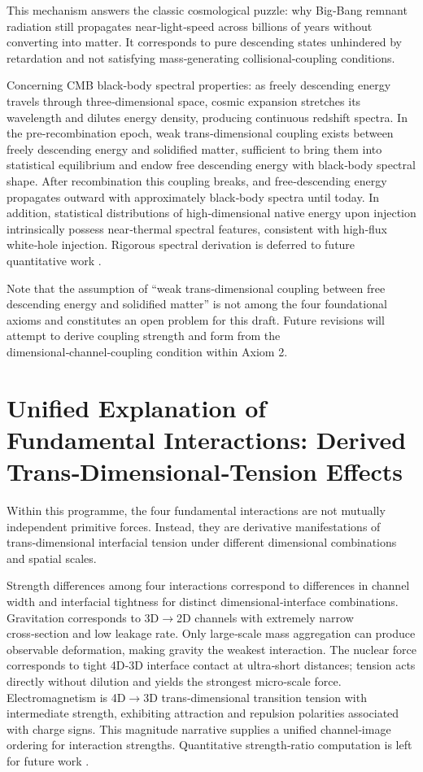 \documentclass[12pt,a4paper]{article}
\begin{document}
This mechanism answers the classic cosmological puzzle: why Big‑Bang remnant radiation still propagates near‑light‑speed across billions of years without converting into matter. It corresponds to pure descending states unhindered by retardation and not satisfying mass‑generating collisional‑coupling conditions.

Concerning CMB black‑body spectral properties: as freely descending energy travels through three‑dimensional space, cosmic expansion stretches its wavelength and dilutes energy density, producing continuous redshift spectra. In the pre‑recombination epoch, weak trans‑dimensional coupling exists between freely descending energy and solidified matter, sufficient to bring them into statistical equilibrium and endow free descending energy with black‑body spectral shape. After recombination this coupling breaks, and free‑descending energy propagates outward with approximately black‑body spectra until today. In addition, statistical distributions of high‑dimensional native energy upon injection intrinsically possess near‑thermal spectral features, consistent with high‑flux white‑hole injection. Rigorous spectral derivation is deferred to future quantitative work \cite{planck2018,komatsu2011}.

Note that the assumption of ``weak trans‑dimensional coupling between free descending energy and solidified matter'' is not among the four foundational axioms and constitutes an open problem for this draft. Future revisions will attempt to derive coupling strength and form from the dimensional‑channel‑coupling condition within Axiom 2.

\section{Unified Explanation of Fundamental Interactions: Derived Trans‑Dimensional‑Tension Effects}
Within this programme, the four fundamental interactions are not mutually independent primitive forces. Instead, they are derivative manifestations of trans‑dimensional interfacial tension under different dimensional combinations and spatial scales.

Strength differences among four interactions correspond to differences in channel width and interfacial tightness for distinct dimensional‑interface combinations. Gravitation corresponds to 3D$\to$2D channels with extremely narrow cross‑section and low leakage rate. Only large‑scale mass aggregation can produce observable deformation, making gravity the weakest interaction. The nuclear force corresponds to tight 4D‑3D interface contact at ultra‑short distances; tension acts directly without dilution and yields the strongest micro‑scale force. Electromagnetism is 4D$\to$3D trans‑dimensional transition tension with intermediate strength, exhibiting attraction and repulsion polarities associated with charge signs. This magnitude narrative supplies a unified channel‑image ordering for interaction strengths. Quantitative strength‑ratio computation is left for future work \cite{griffiths2005,perkins2000}.
\end{document}
